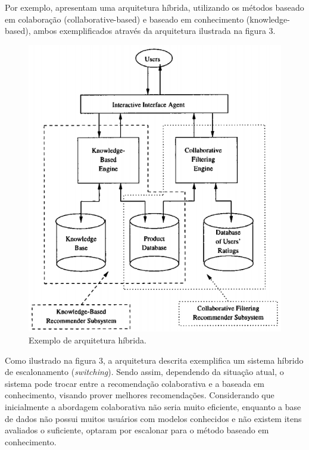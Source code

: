\documentclass[12pt, openright, oneside, a4paper, brazil]{abntex2}
\begin{document}
Por exemplo,  apresentam uma arquitetura híbrida, utilizando os métodos baseado em colaboração (collaborative-based) e baseado em conhecimento (knowledge-based), ambos exemplificados através da arquitetura ilustrada na figura 3.

\begin{figure}[h!tp]

	\caption{\label{hybrid_scheme}Exemplo de arquitetura híbrida.}

	\begin{center}
		\includegraphics[scale=0.8]{images/hybrid_scheme.png}
	\end{center}


\end{figure}

Como ilustrado na figura 3, a arquitetura descrita exemplifica um sistema híbrido de escalonamento (\textit{switching}). Sendo assim, dependendo da situação atual, o sistema pode trocar entre a recomendação colaborativa e a baseada em conhecimento, visando prover melhores recomendações. Considerando que inicialmente a abordagem colaborativa não seria muito eficiente, enquanto a base de dados não possui muitos usuários com modelos conhecidos e não existem itens avaliados o suficiente,  optaram por escalonar para o método baseado em conhecimento.
\end{document}
